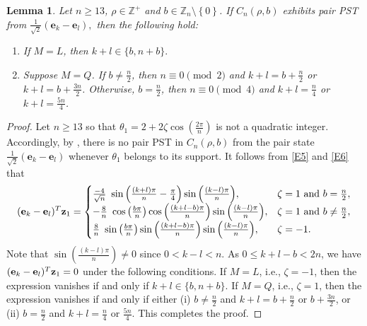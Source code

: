 \documentclass[12pt,a4paper]{article}
\newtheorem{lem}{Lemma}
\def \e {{\mathbf e}}
\def \z {{\bf z}}
\newcommand{\ob}[1]{\left(#1\right)}
\newcommand{\cb}[1]{\left\lbrace #1\right\rbrace}
\begin{document}
\begin{lem}\label{L5}
Let $n \geq 13$, $\rho \in \mathbb{Z}^+$ and $b \in \mathbb{Z}_n\setminus \cb{0}$. If $C_n (\rho, b)$ exhibits pair PST from $\frac{1}{\sqrt{2}}(\e_k-\e_l),$ then the following hold:
\begin{enumerate}
    \item If $M=L$, then $k+l\in\{b,n+b\}.$
    
    \item Suppose $M=Q$. If \( b \ne \frac{n}{2} \), then \( n \equiv 0 \pmod{2} \) and \( k + l = b + \frac{n}{2} \) or \( k + l = b + \frac{3n}{2} \). Otherwise, \( b = \frac{n}{2} \), then \( n \equiv 0 \pmod{4} \) and \( k + l = \frac{n}{4} \) or \( k + l = \frac{5n}{4} \).
\end{enumerate}
\end{lem}
\begin{proof}
Let $n \geq 13$ so that $\theta_1=2+2\zeta \cos\ob{\frac{2\pi}{n}}$ is not a quadratic integer. Accordingly, by \cite[Theorem 3.2]{god25}, there is no pair PST in $C_n (\rho, b)$ from the pair state $\frac{1}{\sqrt{2}}(\e_k-\e_l)$ whenever $\theta_1$ belongs to its support. It follows from \eqref{E5} and \eqref{E6} that
\[
(\e_k-\e_l)^T\z_1=\begin{cases}
\frac{-4}{\sqrt{n}}~ \sin{\left( \frac{(k+l)\pi}{n}-\frac{\pi}{4}\right)}\sin{\left( \frac{(k-l)\pi}{n}\right)}, & \zeta = 1 \text{~and~} b=\frac{n}{2}, \\
-\frac{8}{n}~ \cos{\left( \frac{b\pi}{n} \right)} \cos{\left( \frac{(k+l-b)\pi}{n} \right)}\sin{\left( \frac{(k-l)\pi}{n} \right)}, & \zeta = 1 \text{~and~} b\neq \frac{n}{2}, \\
\frac{8}{n}~ \sin{\left( \frac{b\pi}{n} \right)} \sin{\left( \frac{(k+l-b)\pi}{n} \right)}\sin{\left( \frac{(k-l)\pi}{n} \right)}, &  \zeta = -1.

\end{cases}
\]
Note that \( \sin\left( \frac{(k - l)\pi}{n} \right) \neq 0 \) since \( 0 < k - l < n \). As \( 0 \leq k + l - b < 2n \), we have \( (\e_k - \e_l)^T \z_1 = 0 \) under the following conditions. If $M=L$, i.e., \( \zeta = -1 \), then the expression vanishes if and only if $k+l\in\{b,n+b\}.$ If $M=Q$, i.e., \( \zeta = 1 \), then the expression vanishes if and only if either (i) \( b \neq \frac{n}{2} \) and \( k + l = b + \frac{n}{2} \) or \( b + \frac{3n}{2} \), or (ii)
 \( b = \frac{n}{2} \) and \( k + l = \frac{n}{4} \) or \( \frac{5n}{4} \).
This completes the proof.
\end{proof}
\end{document}
